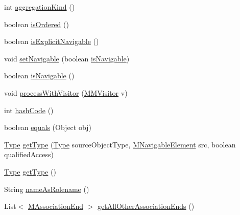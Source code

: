 \begin{DoxyCompactItemize}
\item 
int \hyperlink{classorg_1_1tzi_1_1use_1_1uml_1_1mm_1_1_m_association_end_a8bd51f316d0faa612277bd3a778aa5e2}{aggregation\-Kind} ()
\item 
boolean \hyperlink{classorg_1_1tzi_1_1use_1_1uml_1_1mm_1_1_m_association_end_ab3b11a01cde65e6f48d895feff416416}{is\-Ordered} ()
\item 
boolean \hyperlink{classorg_1_1tzi_1_1use_1_1uml_1_1mm_1_1_m_association_end_a9b894e0659d51ca525629f6873156fda}{is\-Explicit\-Navigable} ()
\item 
void \hyperlink{classorg_1_1tzi_1_1use_1_1uml_1_1mm_1_1_m_association_end_a319a78823e979dc129ea4d256ab4fc1e}{set\-Navigable} (boolean \hyperlink{classorg_1_1tzi_1_1use_1_1uml_1_1mm_1_1_m_association_end_a336148c50192f1a52b3a91806bfcecea}{is\-Navigable})
\item 
boolean \hyperlink{classorg_1_1tzi_1_1use_1_1uml_1_1mm_1_1_m_association_end_a336148c50192f1a52b3a91806bfcecea}{is\-Navigable} ()
\item 
void \hyperlink{classorg_1_1tzi_1_1use_1_1uml_1_1mm_1_1_m_association_end_a3c9bf48e9cf4becff2cf4157c59397c6}{process\-With\-Visitor} (\hyperlink{interfaceorg_1_1tzi_1_1use_1_1uml_1_1mm_1_1_m_m_visitor}{M\-M\-Visitor} v)
\item 
int \hyperlink{classorg_1_1tzi_1_1use_1_1uml_1_1mm_1_1_m_association_end_ae9b5bb87ff365b562b191545e32ae163}{hash\-Code} ()
\item 
boolean \hyperlink{classorg_1_1tzi_1_1use_1_1uml_1_1mm_1_1_m_association_end_aa169ce62d6e33db27dd30a401803d3ee}{equals} (Object obj)
\item 
\hyperlink{interfaceorg_1_1tzi_1_1use_1_1uml_1_1ocl_1_1type_1_1_type}{Type} \hyperlink{classorg_1_1tzi_1_1use_1_1uml_1_1mm_1_1_m_association_end_aea41e1f3c44a8dc39df909e6b94d92a2}{get\-Type} (\hyperlink{interfaceorg_1_1tzi_1_1use_1_1uml_1_1ocl_1_1type_1_1_type}{Type} source\-Object\-Type, \hyperlink{interfaceorg_1_1tzi_1_1use_1_1uml_1_1mm_1_1_m_navigable_element}{M\-Navigable\-Element} src, boolean qualified\-Access)
\item 
\hyperlink{interfaceorg_1_1tzi_1_1use_1_1uml_1_1ocl_1_1type_1_1_type}{Type} \hyperlink{classorg_1_1tzi_1_1use_1_1uml_1_1mm_1_1_m_association_end_ac5ceb1978c9059b590c034f6bf1b5028}{get\-Type} ()
\item 
String \hyperlink{classorg_1_1tzi_1_1use_1_1uml_1_1mm_1_1_m_association_end_a451eaefda755f32a601188c1b98bee6a}{name\-As\-Rolename} ()
\item 
List$<$ \hyperlink{classorg_1_1tzi_1_1use_1_1uml_1_1mm_1_1_m_association_end}{M\-Association\-End} $>$ \hyperlink{classorg_1_1tzi_1_1use_1_1uml_1_1mm_1_1_m_association_end_ad5d08eb6431b4b3685267af88116da5d}{get\-All\-Other\-Association\-Ends} ()

\end{DoxyCompactItemize}
